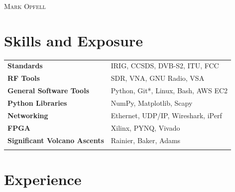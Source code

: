 \documentclass[a4paper, oneside, final]{scrartcl}
\begin{document}
\begin{center} %

\pdfpageheight 11in 
\pdfpagewidth 8.5in


{\fontsize{36}{36}\selectfont\scshape Mark Opfell} 
\vspace{1.16 cm} %


\section{Skills and Exposure}
\begin{tabular}{ @{} >{\bfseries}l @{\hspace{6ex}} l }
Standards & IRIG, CCSDS, DVB-S2, ITU, FCC\\
RF Tools & SDR, VNA, GNU Radio, VSA\\%
General Software Tools & Python, Git*, Linux, Bash, AWS EC2\\%
Python Libraries & NumPy, Matplotlib, Scapy\\%
Networking & Ethernet, UDP/IP, Wireshark, iPerf\\ %
FPGA & Xilinx, PYNQ, Vivado\\
Significant Volcano Ascents &  Rainier, Baker, Adams\\%
\\
\end{tabular}

\section{Experience}


\end{center}
\end{document}
